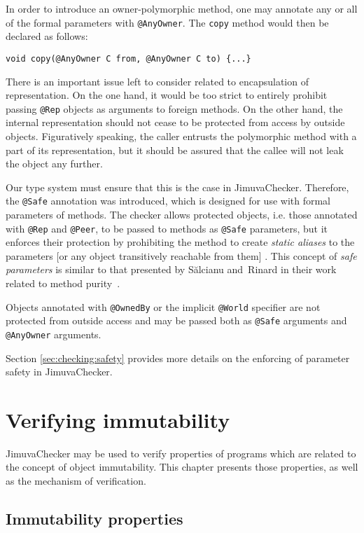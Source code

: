 \documentclass{pracamgr}
\theoremstyle{all}
\newcommand{\todo}[1]{{\color{red} [#1] }}
\begin{document}
In order to introduce an owner-polymorphic method, one may annotate
any or all of the formal parameters with \texttt{@AnyOwner}. The
\texttt{copy} method would then be declared as follows:
\begin{lstlisting}
void copy(@AnyOwner C from, @AnyOwner C to) {...}
\end{lstlisting}

There is an important issue left to consider related to encapsulation
of representation. On the one hand, it would be too strict to entirely
prohibit passing \texttt{@Rep} objects as arguments to foreign
methods. On the other hand, the internal representation should not
cease to be protected from access by outside objects. Figuratively
speaking, the caller entrusts the polymorphic method with a part of
its representation, but it should be assured that the callee will not
leak the object any further.

Our type system must ensure that this is the case in
JimuvaChecker. Therefore, the \texttt{@Safe} annotation was
introduced, which is designed for use with formal parameters of
methods. The checker allows protected objects, i.e. those annotated
with \texttt{@Rep} and \texttt{@Peer}, to be passed to methods as
\texttt{@Safe} parameters, but it enforces their protection by
prohibiting the method to create \emph{static aliases} to the
parameters \todo{or any object transitively reachable from them}. This
concept of \emph{safe parameters} is similar to that presented by
Sălcianu and~Rinard in their work related to method
purity~\cite{purity}.

Objects annotated with \texttt{@OwnedBy} or the implicit
\texttt{@World} specifier are not protected from outside access and
may be passed both as \texttt{@Safe} arguments and \texttt{@AnyOwner}
arguments. 

Section \ref{sec:checking:safety} provides more details on the
enforcing of parameter safety in JimuvaChecker.

\chapter{Verifying immutability}

JimuvaChecker may be used to verify properties of programs which are
related to the concept of object immutability. This chapter presents
those properties, as well as the mechanism of verification.

\section{Immutability properties}
\end{document}
